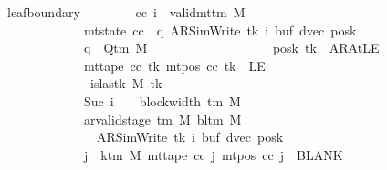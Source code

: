 \begin{isabellebody}
\ \ \ \ \ \ \ leaf{\isacharunderscore}{\kern0pt}boundary{\isacharcolon}{\kern0pt}\isanewline
\ \ \ \ \ \ \ \ {\isachardoublequoteopen}{\isasymAnd}cc\ i{\isachardot}{\kern0pt}\ {\isasymlbrakk}\ valid{\isacharunderscore}{\kern0pt}mttm\ M{\isacharsemicolon}{\kern0pt}\isanewline
\ \ \ \ \ \ \ \ \ \ \ \ \ \ \ \ \ \ \ mt{\isacharunderscore}{\kern0pt}state\ cc\ {\isacharequal}{\kern0pt}\ {\isacharparenleft}{\kern0pt}q{\isacharcomma}{\kern0pt}\ AR{\isacharunderscore}{\kern0pt}SimWrite{\isacharcomma}{\kern0pt}\ tk{\isacharcomma}{\kern0pt}\ i{\isacharcomma}{\kern0pt}\ buf{\isacharcomma}{\kern0pt}\ dvec{\isacharcomma}{\kern0pt}\ posk{\isacharparenright}{\kern0pt}{\isacharsemicolon}{\kern0pt}\isanewline
\ \ \ \ \ \ \ \ \ \ \ \ \ \ \ \ \ \ \ q\ {\isasymin}\ Q{\isacharunderscore}{\kern0pt}tm\ M{\isacharsemicolon}{\kern0pt}\isanewline
\ \ \ \ \ \ \ \ \ \ \ \ \ \ \ \ \ \ \ posk\ tk\ {\isasymnoteq}\ AR{\isacharunderscore}{\kern0pt}AtLE{\isacharsemicolon}{\kern0pt}\isanewline
\ \ \ \ \ \ \ \ \ \ \ \ \ \ \ \ \ \ \ mt{\isacharunderscore}{\kern0pt}tape\ cc\ tk\ {\isacharparenleft}{\kern0pt}mt{\isacharunderscore}{\kern0pt}pos\ cc\ tk{\isacharparenright}{\kern0pt}\ {\isasymnoteq}\ LE{}{\isacharsemicolon}{\kern0pt}\isanewline
\ \ \ \ \ \ \ \ \ \ \ \ \ \ \ \ \ \ \ {\isasymnot}\ is{\isacharunderscore}{\kern0pt}last{\isacharunderscore}{\kern0pt}k\ M\ tk{\isacharsemicolon}{\kern0pt}\isanewline
\ \ \ \ \ \ \ \ \ \ \ \ \ \ \ \ \ \ \ Suc\ i\ {\isacharequal}{\kern0pt}\ {}\ {\isacharasterisk}{\kern0pt}\ block{\isacharunderscore}{\kern0pt}width\ {\isacharparenleft}{\kern0pt}{\isasymGamma}{\isacharunderscore}{\kern0pt}tm\ M{\isacharparenright}{\kern0pt}{\isacharsemicolon}{\kern0pt}\isanewline
\ \ \ \ \ \ \ \ \ \ \ \ \ \ \ \ \ \ \ ar{\isacharunderscore}{\kern0pt}valid{\isacharunderscore}{\kern0pt}stage\ {\isacharparenleft}{\kern0pt}{\isasymGamma}{\isacharunderscore}{\kern0pt}tm\ M{\isacharparenright}{\kern0pt}\ {\isacharparenleft}{\kern0pt}bl{\isacharunderscore}{\kern0pt}tm\ M{\isacharparenright}{\kern0pt}\isanewline
\ \ \ \ \ \ \ \ \ \ \ \ \ \ \ \ \ \ \ \ \ {\isacharparenleft}{\kern0pt}AR{\isacharunderscore}{\kern0pt}SimWrite{\isacharcomma}{\kern0pt}\ tk{\isacharcomma}{\kern0pt}\ i{\isacharcomma}{\kern0pt}\ buf{\isacharcomma}{\kern0pt}\ dvec{\isacharcomma}{\kern0pt}\ posk{\isacharparenright}{\kern0pt}{\isacharsemicolon}{\kern0pt}\isanewline
\ \ \ \ \ \ \ \ \ \ \ \ \ \ \ \ \ \ \ {\isasymforall}j\ {\isasymge}\ k{\isacharunderscore}{\kern0pt}tm\ M{\isachardot}{\kern0pt}\ mt{\isacharunderscore}{\kern0pt}tape\ cc\ j\ {\isacharparenleft}{\kern0pt}mt{\isacharunderscore}{\kern0pt}pos\ cc\ j{\isacharparenright}{\kern0pt}\ {\isacharequal}{\kern0pt}\ BLANK{}{\isacharsemicolon}{\kern0pt}\isanewline

\end{isabellebody}
